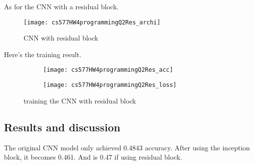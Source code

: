 \documentclass{article}
\begin{document}
As for the CNN with a residual block.

\begin{figure}[h!]
    \centering
    \texttt{[image: cs577HW4programmingQ2Res\_archi]}
    \caption{CNN with residual block}
\end{figure}

Here's the training result.

\begin{figure}[h!]
    \centering
    \begin{subfigure}{.48\textwidth}
        \centering
        \texttt{[image: cs577HW4programmingQ2Res\_acc]}
    \end{subfigure}
    \begin{subfigure}{.48\textwidth}
        \centering
        \texttt{[image: cs577HW4programmingQ2Res\_loss]}
    \end{subfigure}
    \caption{training the CNN with residual block}
\end{figure}


\subsection*{Results and discussion}

The original CNN model only achieved 0.4843 accuracy. After using the inception block, it becomes 0.461. And is 0.47 if using residual block.
\end{document}
